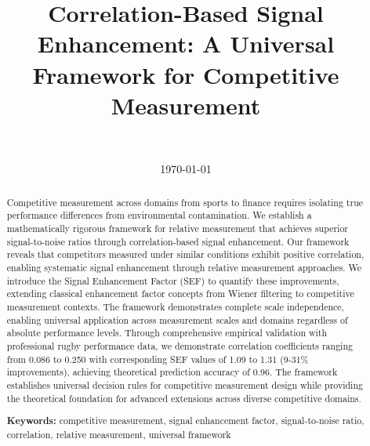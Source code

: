 \documentclass[11pt,a4paper]{article}
\title{Correlation-Based Signal Enhancement: A Universal Framework for Competitive Measurement}
\author{
    \authorone \\
    \textit{\affiliationone}
}
\date{\today}
\begin{document}
\maketitle

\begin{abstract}
Competitive measurement across domains from sports to finance requires isolating true performance differences from environmental contamination. We establish a mathematically rigorous framework for relative measurement that achieves superior signal-to-noise ratios through correlation-based signal enhancement. Our framework reveals that competitors measured under similar conditions exhibit positive correlation, enabling systematic signal enhancement through relative measurement approaches. We introduce the Signal Enhancement Factor (SEF) to quantify these improvements, extending classical enhancement factor concepts from Wiener filtering to competitive measurement contexts. The framework demonstrates complete scale independence, enabling universal application across measurement scales and domains regardless of absolute performance levels. Through comprehensive empirical validation with professional rugby performance data, we demonstrate correlation coefficients ranging from 0.086 to 0.250 with corresponding SEF values of 1.09 to 1.31 (9-31\% improvements), achieving theoretical prediction accuracy of 0.96. The framework establishes universal decision rules for competitive measurement design while providing the theoretical foundation for advanced extensions across diverse competitive domains.

\textbf{Keywords:} competitive measurement, signal enhancement factor, signal-to-noise ratio, correlation, relative measurement, universal framework
\end{abstract}













\end{document}
